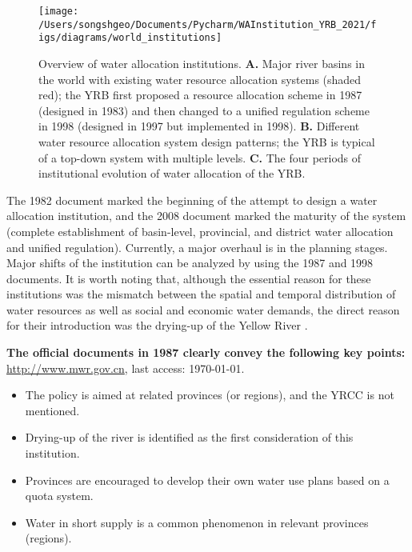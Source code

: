 \documentclass{article}
\begin{document}
\begin{figure}[!htb]
    \centering
    \texttt{[image: /Users/songshgeo/Documents/Pycharm/WAInstitution\_YRB\_2021/figs/diagrams/world\_institutions]}
	\caption{
		Overview of water allocation institutions.
		\textbf{A.} Major river basins in the world with existing water resource allocation systems (shaded red); the YRB first proposed a resource allocation scheme in 1987 (designed in 1983) and then changed to a unified regulation scheme in 1998 (designed in 1997 but implemented in 1998).
		\textbf{B.} Different water resource allocation system design patterns; the YRB is typical of a top-down system with multiple levels.
		\textbf{C.} The four periods of institutional evolution of water allocation of the YRB.
	}
    \label{fig:world}
\end{figure}
The 1982 document marked the beginning of the attempt to design a water allocation institution, and the 2008 document marked the maturity of the system (complete establishment of basin-level, provincial, and district water allocation and unified regulation). Currently, a major overhaul is in the planning stages. Major shifts of the institution can be analyzed by using the 1987 and 1998 documents. It is worth noting that, although the essential reason for these institutions was the mismatch between the spatial and temporal distribution of water resources as well as social and economic water demands, the direct reason for their introduction was the drying-up of the Yellow River \cite{wangReviewImplementationYellow2019}.

\textbf{The official documents in 1987 clearly convey the following key points:}
\href{http://www.gov.cn/zhengce/content/2011-03/30/content_3138.htm#}{http://www.mwr.gov.cn}, last access: \today.
\begin{itemize}
	\item The policy is aimed at related provinces (or regions), and the YRCC is not mentioned.
	\item Drying-up of the river is identified as the first consideration of this institution.
	\item Provinces are encouraged to develop their own water use plans based on a quota system.
	\item Water in short supply is a common phenomenon in relevant provinces (regions).
\end{itemize}
\end{document}
